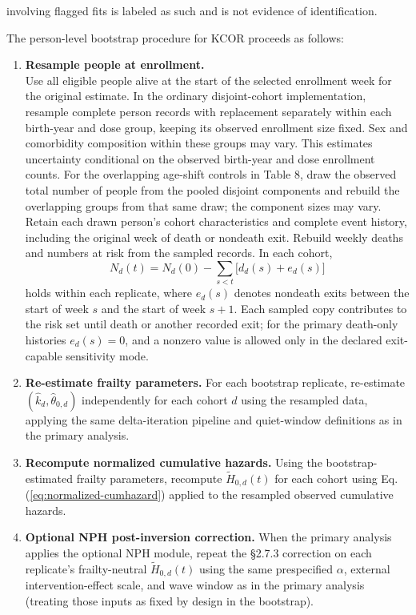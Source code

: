 \documentclass[
]{article}
\begin{document}
involving flagged fits is labeled as such and is not evidence of identification.

The person-level bootstrap procedure for KCOR proceeds as follows:

\begin{enumerate}
\def\labelenumi{\arabic{enumi}.}
\item
  \textbf{Resample people at enrollment.}\\
  Use all eligible people alive at the start of the selected enrollment week for the original estimate. In the ordinary disjoint-cohort implementation, resample complete person records with replacement separately within each birth-year and dose group, keeping its observed enrollment size fixed. Sex and comorbidity composition within these groups may vary. This estimates uncertainty conditional on the observed birth-year and dose enrollment counts. For the overlapping age-shift controls in Table 8, draw the observed total number of people from the pooled disjoint components and rebuild the overlapping groups from that same draw; the component sizes may vary. Retain each drawn person's cohort characteristics and complete event history, including the original week of death or nondeath exit. Rebuild weekly deaths and numbers at risk from the sampled records. In each cohort, \[N_d(t)=N_d(0)-\sum_{s<t}\big[d_d(s)+e_d(s)\big]\] holds within each replicate, where \(e_d(s)\) denotes nondeath exits between the start of week \(s\) and the start of week \(s+1\). Each sampled copy contributes to the risk set until death or another recorded exit; for the primary death-only histories \(e_d(s)=0\), and a nonzero value is allowed only in the declared exit-capable sensitivity mode.
\item
  \textbf{Re-estimate frailty parameters.} For each bootstrap replicate, re-estimate \((\hat{k}_d,\hat{\theta}_{0,d})\) independently for each cohort \(d\) using the resampled data, applying the same delta-iteration pipeline and quiet-window definitions as in the primary analysis.
\item
  \textbf{Recompute normalized cumulative hazards.} Using the bootstrap-estimated frailty parameters, recompute \(\tilde H_{0,d}(t)\) for each cohort using Eq. (\ref{eq:normalized-cumhazard}) applied to the resampled observed cumulative hazards.
\item
  \textbf{Optional NPH post-inversion correction.} When the primary analysis applies the optional NPH module, repeat the §2.7.3 correction on each replicate's frailty-neutral \(\tilde H_{0,d}(t)\) using the same prespecified \(\alpha\), external intervention-effect scale, and wave window as in the primary analysis (treating those inputs as fixed by design in the bootstrap).

\end{enumerate}
\end{document}
